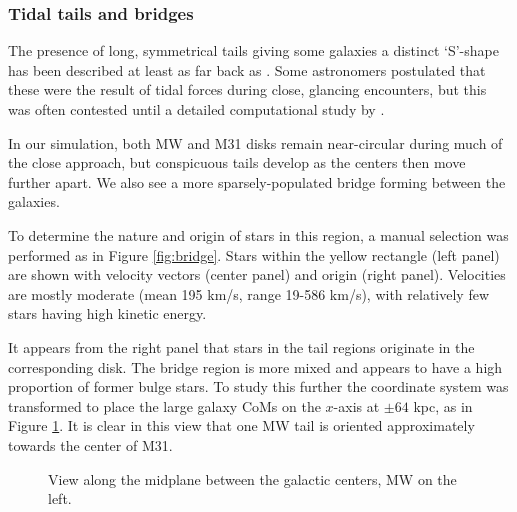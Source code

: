 \documentclass[twocolumn]{aastex63}
\begin{document}
\subsubsection{Tidal tails and bridges}

The presence of long, symmetrical tails giving some galaxies a distinct `S'-shape has been described at least as far back as \citet{zwicky_novel_1955}. Some astronomers postulated that these were the result of tidal forces during close, glancing encounters, but this was often contested until a detailed computational study by \citet{toomre_galactic_1972}.

In our simulation, both MW and M31 disks remain near-circular during much of the close approach, but conspicuous tails develop as the centers then move further apart. We also see a more sparsely-populated bridge forming between the galaxies.

To determine the nature and origin of stars in this region, a manual selection was performed as in Figure \ref{fig:bridge}. Stars within the yellow rectangle (left panel) are shown with velocity vectors (center panel) and origin (right panel). Velocities are mostly moderate (mean 195 km/s, range 19-586 km/s), with relatively few stars having high kinetic energy. 


\begin{figure*}[ht!]
	\caption{Manual selection of bridge particles at 0.33 Gyr after the first MW-M31 pericenter. The left panel shows stellar surface density and the selected region. The center panel shows velocity vectors for these stars and the right panel shows origin by galaxy and particle type. Orientation is with MW top, M31 bottom and M33 lower left.
	\label{fig:bridge}}
\end{figure*}

It appears from the right panel that stars in the tail regions originate in the corresponding disk. The bridge region is more mixed and appears to have a high proportion of former bulge stars. To study this further the coordinate system was transformed to place the large galaxy CoMs on the $x$-axis at $\pm 64$ kpc, as in Figure \ref{fig:bridge2}. It is clear in this view that one MW tail is oriented approximately towards the center of M31. 

\begin{figure}[htb!]
	\caption{View along the midplane between the galactic centers, MW on the left.
		\label{fig:bridge2}}
\end{figure}
\end{document}
